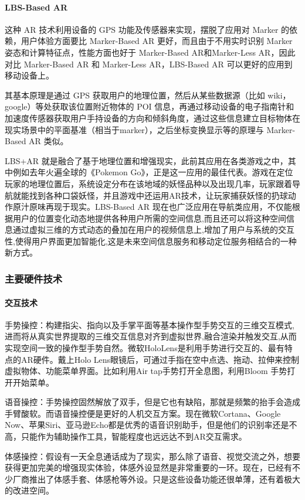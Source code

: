 \documentclass{article}
\begin{document}
\paragraph{LBS-Based AR}
这种 AR 技术利用设备的 GPS 功能及传感器来实现，摆脱了应用对 Marker 的依赖，用户体验方面要比 Marker-Based AR 更好，而且由于不用实时识别 Marker 姿态和计算特征点，性能方面也好于 Marker-Based AR和Marker-Less AR，因此对比 Marker-Based AR 和 Marker-Less AR，LBS-Based AR 可以更好的应用到移动设备上。\par
其基本原理是通过 GPS 获取用户的地理位置，然后从某些数据源（比如 wiki，google）等处获取该位置附近物体的 POI 信息，再通过移动设备的电子指南针和加速度传感器获取用户手持设备的方向和倾斜角度，通过这些信息建立目标物体在现实场景中的平面基准（相当于marker），之后坐标变换显示等的原理与 Marker-Based AR 类似。\par
LBS+AR 就是融合了基于地理位置和增强现实，此前其应用在各类游戏之中，其中例如去年火遍全球的《Pokemon Go》，正是这一应用的最佳代表。游戏在定位玩家的地理位置后，系统设定分布在该地域的妖怪品种以及出现几率，玩家跟着导航就能找到各种口袋妖怪，并且游戏中还运用AR技术，让玩家捕获妖怪的扔球动作原汁原味再现于现实。LBS-Based AR 现在也广泛应用在导航类应用，不仅能根据用户的位置变化动态地提供各种用户所需的空间信息,而且还可以将这种空间信息通过虚拟三维的方式动态的叠加在用户的视频信息上,增加了用户与系统的交互性,使得用户界面更加智能化,这是未来空间信息服务和移动定位服务相结合的一种新方式\citep{xueliming}。 \par
\subsubsection{主要硬件技术}
\paragraph{交互技术}
手势操控：构建指尖、指向以及手掌平面等基本操作型手势交互的三维交互模式,进而将从真实世界提取的三维交互信息对齐到虚拟世界,融合渲染并触发交互,从而实现空间一致的操作型手势自然\citep{sunchao}。微软HoloLens是利用手势进行交互的、最有特点的AR硬件。戴上Holo Lens眼镜后，可通过手指在空中点选、拖动、拉伸来控制虚拟物体、功能菜单界面。比如利用Air tap手势打开全息图，利用Bloom 手势打开开始菜单。\par
语音操控：手势操控固然解放了双手，但是它也有缺陷，那就是频繁的抬手会造成手臂酸软。而语音操控便是更好的人机交互方案。现在微软Cortana、Google Now、苹果Siri、亚马逊Echo都是优秀的语音识别助手，但是他们的识别率还是不高，只能作为辅助操作工具，智能程度也远远达不到AR交互需求。\par
体感操控：假设有一天全息通话成为了现实，那么除了语音、视觉交流之外，想要获得更加完美的增强现实体验，体感外设显然是非常重要的一环。现在，已经有不少厂商推出了体感手套、体感枪等外设。只是这些设备功能还很单薄，还有着极大的改进空间。\par
\end{document}
